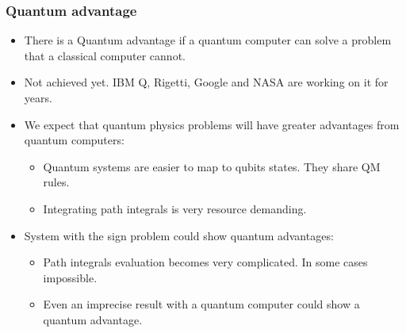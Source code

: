 \documentclass[11pt,t,xcolor=dvipsnames,aspectratio=169]{beamer}
\begin{document}
\begin{frame}
    \frametitle{Quantum advantage}
    \begin{itemize}
        \item
            There is a Quantum advantage if a quantum computer can solve a problem that a classical computer cannot.
        \item
            Not achieved yet. IBM Q, Rigetti, Google and NASA are working on it for years.
        \item
            We expect that quantum physics problems will have greater advantages from quantum computers:
            \begin{itemize}
                \item Quantum systems are easier to map to qubits states. They share QM rules.
                \item Integrating path integrals is very resource demanding.
            \end{itemize}
        \item
            System with the sign problem could show quantum advantages:
            \begin{itemize}
                \item Path integrals evaluation becomes very complicated. In some cases impossible.
                \item Even an imprecise result with a quantum computer could show a quantum advantage.
            \end{itemize}
    \end{itemize}
\end{frame}
\end{document}
